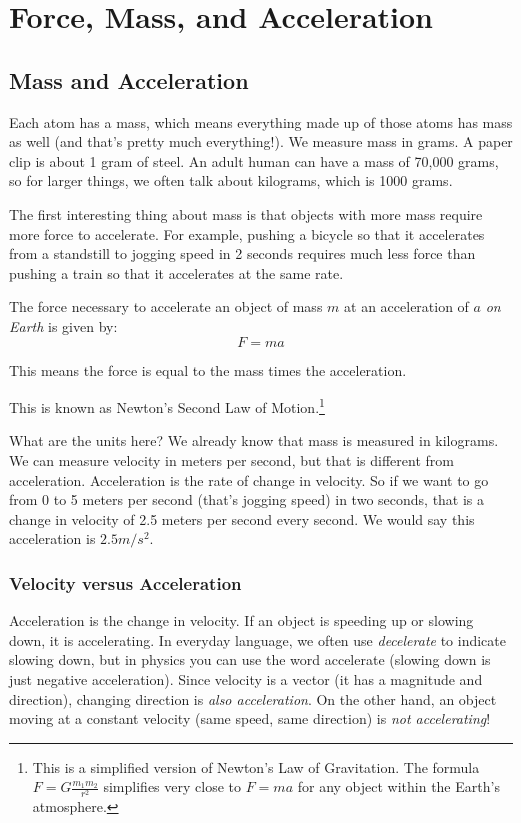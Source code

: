 \chapter{Force, Mass, and Acceleration}

\section{Mass and Acceleration}

Each atom has a mass, which means everything made up of those atoms has mass as 
well (and that's pretty much everything!). We measure mass in grams. A paper clip 
is about 1 gram of steel. An adult human can have a mass of 70,000 grams, so for 
larger things, we often talk about kilograms, which is 1000 grams.

The first interesting thing about mass is that objects with more mass
require more force to accelerate. For example, pushing a bicycle so
that it accelerates from a standstill to jogging speed in 2 seconds
requires much less force than pushing a train so that it accelerates
at the same rate.


\begin{mdframed}[style=important, frametitle={Newton's Second Law of Motion}]

The force necessary to accelerate an object of mass $m$ at an acceleration of
$a$ \emph{on Earth} is given by:
$$F = m a$$

This means the force is equal to the mass times the acceleration.

\end{mdframed}

This is known as Newton's Second Law of Motion.\footnote{This is a simplified version of Newton's Law of Gravitation. The formula $F = G\frac{m_1 m_2}{r^2}$ simplifies very close to $F=ma$ for any object within the Earth's atmosphere.} 

What are the units here? We already know that mass is measured in
kilograms. We can measure velocity in meters per second, but that is
different from acceleration. Acceleration is the rate of change in
velocity. So if we want to go from 0 to 5 meters per second (that's
jogging speed) in two seconds, that is a change in velocity of 2.5
meters per second every second. We would say this acceleration is $2.5
m/s^2$.

\subsection{Velocity versus Acceleration}
Acceleration is the change in velocity. If an object is speeding up or slowing 
down, it is accelerating. In everyday language, we often use \textit{decelerate} 
to indicate slowing down, but in physics you can use the word accelerate (slowing 
down is just negative acceleration). Since velocity is a vector (it has a 
magnitude and direction), changing direction is \textit{also acceleration}. On 
the other hand, an object moving at a constant velocity (same speed, same 
direction) is \textit{not accelerating}!

